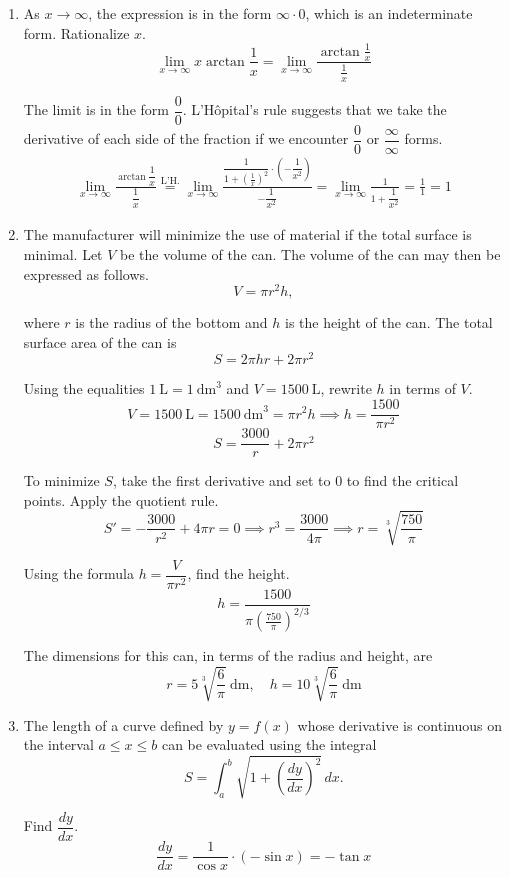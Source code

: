 \documentclass[a4paper, 12pt]{article}
\begin{document}
\begin{enumerate}[leftmargin=*,label=\textbf{\arabic*.}]
\newpage

\item As $x\to\infty$, the expression is in the form $\infty\cdot 0$, which is an indeterminate form. Rationalize $x$.
\[\lim_{x\to\infty}x\arctan\frac1x=\lim_{x\to\infty}\frac{\arctan\frac1x}{\frac1x}\]

The limit is in the form $\dfrac00$. L'Hôpital's rule suggests that we take the derivative of each side of the fraction if we encounter $\dfrac00$ or $\dfrac\infty\infty$ forms.
\begin{align*}\lim_{x\to\infty}\frac{\arctan\dfrac1x}{\dfrac1x}\overset{\text{L'H.}}{=}\lim_{x\to\infty}\frac{\dfrac1{1+\left(\frac1x\right)^2}\cdot\left(-\dfrac1{x^2}\right)}{-\dfrac1{x^2}}=\lim_{x\to\infty}\frac1{1+\dfrac1{x^2}}=\frac11=\boxed{1}\end{align*}

\item The manufacturer will minimize the use of material if the total surface is minimal. Let $V$ be the volume of the can. The volume of the can may then be expressed as follows.
\[V=\pi r^2h,\]

where $r$ is the radius of the bottom and $h$ is the height of the can. The total surface area of the can is
\[S=2\pi hr+2\pi r^2\]

Using the equalities $1\:\text{L}=1\:\text{dm}^3$ and $V=1500\:\text{L}$, rewrite $h$ in terms of $V$.
\[V=1500\:\text{L}=1500\:\text{dm}^3=\pi r^2h\implies h=\frac{1500}{\pi r^2}\]
\[S=\frac{3000}r+2\pi r^2\]

To minimize $S$, take the first derivative and set to $0$ to find the critical points. Apply the quotient rule.
\[S'=-\frac{3000}{r^2}+4\pi r=0\implies r^3=\frac{3000}{4\pi}\implies r=\sqrt[3]{\frac{750}{\pi}}\]

Using the formula $h=\dfrac V{\pi r^2}$, find the height.
\[h=\frac{1500}{\pi\left(\frac{750}{\pi}\right)^{2/3}}\]

The dimensions for this can, in terms of the radius and height, are
\[\boxed{r=5\sqrt[3]{\frac{6}\pi}\:\text{dm},\quad h=10\sqrt[3]{\frac6\pi}\:\text{dm}}\]

\newpage

\item The length of a curve defined by $y=f(x)$ whose derivative is continuous on the interval $a\leq x\leq b$ can be evaluated using the integral
\[S=\int_a^b\sqrt{1+\left(\frac{dy}{dx}\right)^2}\,dx.\]

Find $\dfrac{dy}{dx}$.
\[\frac{dy}{dx}=\frac1{\cos x}\cdot (-\sin x)=-\tan x\]


\end{enumerate}
\end{document}
